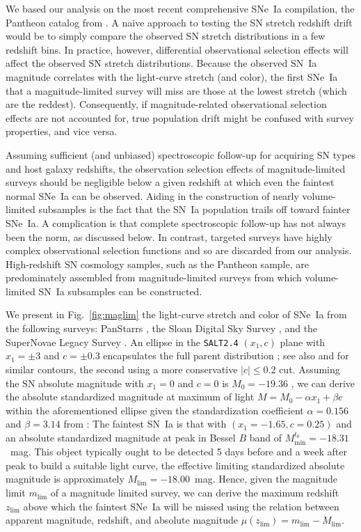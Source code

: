 \documentclass[]{aa}
\begin{document}
We based our analysis on the most recent comprehensive SNe~Ia compilation, the
Pantheon catalog from \cite{scolnic2018a}. A naive approach to testing the SN
stretch redshift drift would be to simply compare the observed SN stretch
distributions in a few redshift bins. In practice, however, differential
observational selection effects will affect the observed SN
stretch distributions. Because the observed SN~Ia magnitude correlates
with the light-curve stretch (and color), the first SNe~Ia that a
magnitude-limited survey will miss are those at the lowest stretch (which are the reddest).
Consequently, if magnitude-related observational selection effects are
not accounted for, true population drift might be confused with survey
properties, and vice versa.

Assuming sufficient (and unbiased) spectroscopic follow-up for acquiring
SN types and host galaxy redshifts, the observation selection
effects of magnitude-limited surveys should be negligible below a given redshift
at which even the faintest normal SNe~Ia can be observed.
Aiding in the construction of nearly volume-limited subsamples is the
    fact that the SN~Ia population trails off toward fainter SNe~Ia. A
    complication is that complete spectroscopic follow-up has not always been
    the norm, as discussed below. In contrast, targeted surveys have highly
    complex observational selection functions and so are
    discarded from our analysis. High-redshift SN cosmology samples,
    such as the Pantheon sample, are predominately assembled from magnitude-limited surveys from
which volume-limited SN~Ia subsamples can be constructed.

We present in Fig.~\ref{fig:maglim} the light-curve stretch and color of SNe~Ia
from the following surveys: PanStarrs \citep[PS1][]{rest2014}, the Sloan Digital
Sky Survey \citep[SDSS][]{frieman2008}, and the SuperNovae Legacy Survey
\citep[SNLS][]{astier2006}. An ellipse in the \textsc{\texttt{SALT2.4}} $(x_1,
c)$ plane with $x_1 = \pm 3$ and $c = \pm 0.3$ encapsulates the full
parent distribution \citep{guy2007, betoule2014}; see also
\citet{bazin2011} and \citet{campbell2013} for similar contours, the second
using a more conservative $|c| \leq 0.2$ cut. Assuming the SN absolute magnitude
with $x_1=0$ and $c=0$ is $M_0=-19.36$ \citep{kessler2009,scolnic2014}, we can
derive the absolute standardized magnitude at maximum of light $M = M_0 - \alpha
x_1 + \beta c$ within the aforementioned ellipse given the standardization
coefficient $\alpha=0.156$ and $\beta=3.14$ from \cite{scolnic2018a}: The
faintest SN~Ia is that with $(x_1=-1.65, c=0.25)$ and an absolute standardized
magnitude at peak in Bessel $B$ band of $M^{t_0}_{\min} = -18.31$~mag. This object typically ought to be detected 5 days before and a week after peak to
build a suitable light curve, the effective limiting standardized absolute
magnitude is approximately $M_{\lim} = -18.00$~mag. Hence, given the magnitude
limit $m_{\lim}$ of a magnitude limited survey, we can derive the maximum
redshift $z_{\lim}$ above which the faintest SNe~Ia will be missed using the
relation between apparent magnitude, redshift, and absolute magnitude
$\mu(z_{\lim}) = m_{\lim} - M_{\lim}$.
\end{document}
